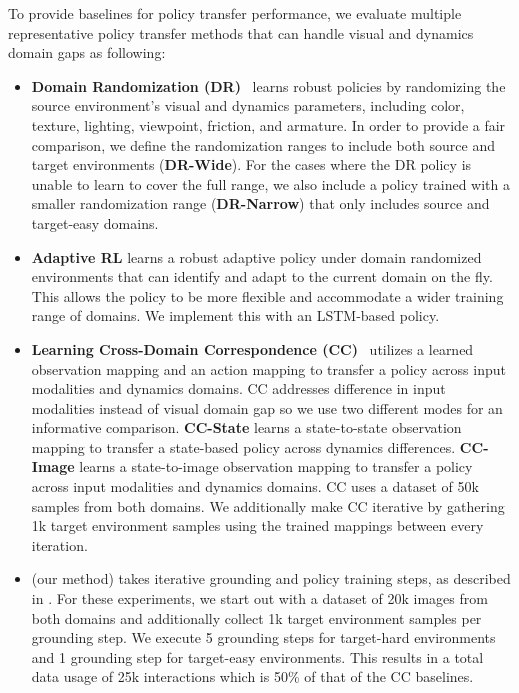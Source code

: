 To provide baselines for policy transfer performance, we evaluate multiple representative policy transfer methods that can handle visual and dynamics domain gaps as following:
\begin{itemize}
    \item \textbf{Domain Randomization (DR)}~\citep{tobin2017domain, peng2018sim} learns robust policies by randomizing the source environment's visual and dynamics parameters, including color, texture, lighting, viewpoint, friction, and armature. In order to provide a fair comparison, we define the randomization ranges to include both source and target environments (\textbf{DR-Wide}). For the cases where the DR policy is unable to learn to cover the full range, we also include a policy trained with a smaller randomization range (\textbf{DR-Narrow}) that only includes source and target-easy domains.
    
    \item \textbf{Adaptive RL} learns a robust adaptive policy under domain randomized environments that can identify and adapt to the current domain on the fly.  This allows the policy to be more flexible and accommodate a wider training range of domains.  We implement this with an LSTM-based policy.

    \item \textbf{Learning Cross-Domain Correspondence (CC)}~\citep{zhang2021learning} utilizes a learned observation mapping and an action mapping to transfer a policy across input modalities and dynamics domains.  CC addresses difference in input modalities instead of visual domain gap so we use two different modes for an informative comparison.  \textbf{CC-State} learns a state-to-state observation mapping to transfer a state-based policy across dynamics differences.  \textbf{CC-Image} learns a state-to-image observation mapping to transfer a policy across input modalities and dynamics domains.  CC uses a dataset of 50k samples from both domains.  We additionally make CC iterative by gathering 1k target environment samples using the trained mappings between every iteration.
    
    \item \textbf{\method} (our method) takes iterative grounding and policy training steps, as described in . For these experiments, we start out with a dataset of 20k images from both domains and additionally collect 1k target environment samples per grounding step.  We execute 5 grounding steps for target-hard environments and 1 grounding step for target-easy environments.  This results in a total data usage of 25k interactions which is 50\% of that of the CC baselines.  
\end{itemize}

